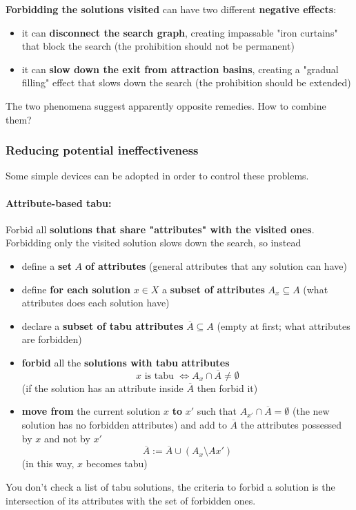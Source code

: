 \documentclass[11pt]{article}
\begin{document}
	\textbf{Forbidding the solutions visited} can have two different \textbf{negative effects}:
	\begin{itemize}
		\item it can \textbf{disconnect the search graph}, creating impassable "iron curtains" that block the search (the prohibition should not be permanent)
		
		\item it can \textbf{slow down the exit from attraction basins}, creating a "gradual filling" effect that slows down the search (the prohibition should be extended)
	\end{itemize}
	
	The two phenomena suggest apparently opposite remedies. How to combine them? \\
	
	\newpage
	
	\subsubsection{Reducing potential ineffectiveness}
	
	Some simple devices can be adopted in order to control these problems.\\
	
	\paragraph{Attribute-based tabu:} Forbid all \textbf{solutions that share "attributes" with the visited ones}.\\
	
	Forbidding only the visited solution slows down the search, so instead
	\begin{itemize}
		\item define a \textbf{set} $A$ \textbf{of attributes} (general attributes that any solution can have)
		
		\item define \textbf{for each solution} $x \in X$ a \textbf{subset of attributes} $A_x \subseteq A$ (what attributes does each solution have)
		
		\item declare a \textbf{subset of tabu attributes} $\overline{A} \subseteq A$ (empty at first; what attributes are forbidden)
		
		\item \textbf{forbid} all the \textbf{solutions with tabu attributes}
		$$ x \text{ is tabu } \Leftrightarrow A_x \cap \overline{A} \neq \emptyset $$
		(if the solution has an attribute inside $\overline{A}$ then forbid it)
		
		\item \textbf{move from} the current solution $x$ \textbf{to} $x'$ such that $A_{x'} \cap \overline{A} = \emptyset$ (the new solution has no forbidden attributes) and add to $\overline{A}$ the attributes possessed by $x$ and not by $x'$
		$$ \overline{A} := \overline{A} \cup (A_x \setminus A{x'} ) $$
		(in this way, $x$ becomes tabu)
	\end{itemize}
	You don't check a list of tabu solutions, the criteria to forbid a solution is the intersection of its attributes with the set of forbidden ones.\\
	
\end{document}
